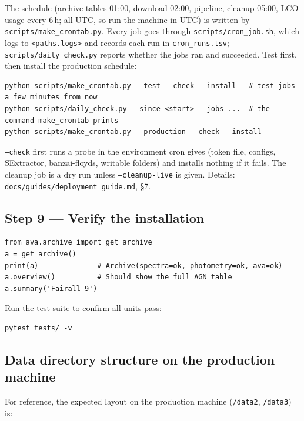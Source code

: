 \documentclass[12pt,a4paper]{article}
\begin{document}
The schedule (archive tables 01:00, download 02:00, pipeline, cleanup 05:00, LCO usage every 6\,h; all
UTC, so run the machine in UTC) is written by \texttt{scripts/make\_crontab.py}.  Every job goes through
\texttt{scripts/cron\_job.sh}, which logs to \texttt{<paths.logs>} and records each run in
\texttt{cron\_runs.tsv}; \texttt{scripts/daily\_check.py} reports whether the jobs ran and succeeded.
Test first, then install the production schedule:
\begin{lstlisting}[style=shell]
python scripts/make_crontab.py --test --check --install   # test jobs a few minutes from now
python scripts/daily_check.py --since <start> --jobs ...  # the command make_crontab prints
python scripts/make_crontab.py --production --check --install
\end{lstlisting}
\texttt{--check} first runs a probe in the environment cron gives (token file, configs, SExtractor,
banzai-floyds, writable folders) and installs nothing if it fails.  The cleanup job is a dry run unless
\texttt{--cleanup-live} is given.  Details: \texttt{docs/guides/deployment\_guide.md}, \S7.

\subsection{Step 9 --- Verify the installation}

\begin{lstlisting}[style=python]
from ava.archive import get_archive
a = get_archive()
print(a)              # Archive(spectra=ok, photometry=ok, ava=ok)
a.overview()          # Should show the full AGN table
a.summary('Fairall 9')
\end{lstlisting}

Run the test suite to confirm all units pass:
\begin{lstlisting}[style=shell]
pytest tests/ -v
\end{lstlisting}

\subsection{Data directory structure on the production machine}

For reference, the expected layout on the production machine
(\texttt{/data2}, \texttt{/data3}) is:
\end{document}
